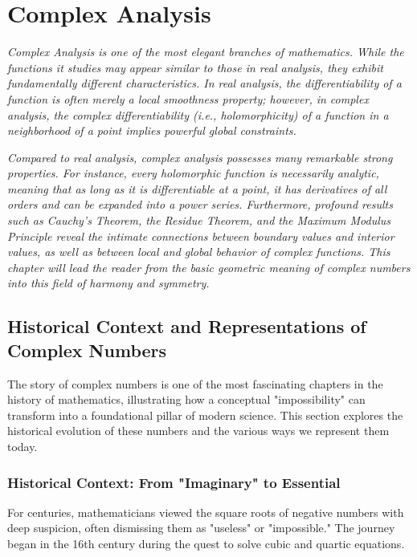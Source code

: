 \chapter{Complex Analysis}

\emph{Complex Analysis is one of the most elegant branches of mathematics. While the functions it studies may appear similar to those in real analysis, they exhibit fundamentally different characteristics. In real analysis, the differentiability of a function is often merely a local smoothness property; however, in complex analysis, the complex differentiability (i.e., holomorphicity) of a function in a neighborhood of a point implies powerful global constraints.}

\emph{Compared to real analysis, complex analysis possesses many remarkable strong properties. For instance, every holomorphic function is necessarily analytic, meaning that as long as it is differentiable at a point, it has derivatives of all orders and can be expanded into a power series. Furthermore, profound results such as Cauchy's Theorem, the Residue Theorem, and the Maximum Modulus Principle reveal the intimate connections between boundary values and interior values, as well as between local and global behavior of complex functions. This chapter will lead the reader from the basic geometric meaning of complex numbers into this field of harmony and symmetry.}

\section{Historical Context and Representations of Complex Numbers}

The story of complex numbers is one of the most fascinating chapters in the history of mathematics, illustrating how a conceptual "impossibility" can transform into a foundational pillar of modern science. This section explores the historical evolution of these numbers and the various ways we represent them today.

\subsection{Historical Context: From "Imaginary" to Essential}

For centuries, mathematicians viewed the square roots of negative numbers with deep suspicion, often dismissing them as "useless" or "impossible." The journey began in the 16th century during the quest to solve cubic and quartic equations.

